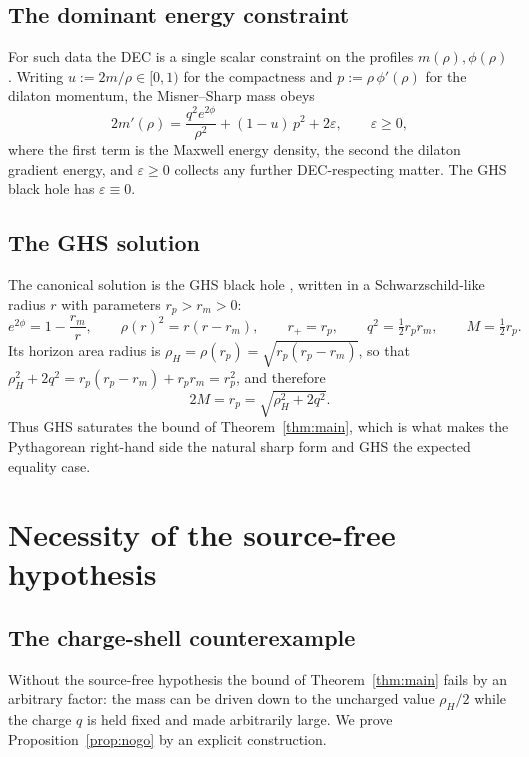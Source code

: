 \documentclass[11pt]{article}
\theoremstyle{plain}
\theoremstyle{definition}
\newcommand{\rH}{\rho_{\!H}}
\newcommand{\eps}{\varepsilon}
\begin{document}
\subsection{The dominant energy constraint}\label{sec:constraint}

For such data the DEC is a single scalar constraint on the profiles $m(\rho),\phi(\rho)$. Writing
$u:=2m/\rho\in[0,1)$ for the compactness and $p:=\rho\,\phi'(\rho)$ for the dilaton momentum, the Misner--Sharp
mass obeys
\begin{equation}\label{eq:constraint}
  2m'(\rho)=\frac{q^2e^{2\phi}}{\rho^2}+(1-u)\,p^2+2\eps,\qquad \eps\ge0,
\end{equation}
where the first term is the Maxwell energy density, the second the dilaton gradient energy, and $\eps\ge0$
collects any further DEC-respecting matter. The GHS black hole has $\eps\equiv0$.

\subsection{The GHS solution}\label{sec:ghs}

The canonical solution is the GHS black hole \cite{GHS,GibbonsMaeda}, written in a Schwarzschild-like radius
$r$ with parameters $r_p>r_m>0$:
\begin{equation}\label{eq:ghs}
  e^{2\phi}=1-\frac{r_m}{r},\qquad \rho(r)^2=r(r-r_m),\qquad
  r_+=r_p,\qquad q^2=\tfrac12 r_p r_m,\qquad M=\tfrac12 r_p .
\end{equation}
Its horizon area radius is $\rH=\rho(r_p)=\sqrt{r_p(r_p-r_m)}$, so that
$\rH^2+2q^2=r_p(r_p-r_m)+r_pr_m=r_p^2$, and therefore
\begin{equation*}
  2M=r_p=\sqrt{\rH^2+2q^2}.
\end{equation*}
Thus GHS saturates the bound of Theorem~\ref{thm:main}, which is what makes the Pythagorean right-hand side the
natural sharp form and GHS the expected equality case.

\section{Necessity of the source-free hypothesis}\label{sec:false}

\subsection{The charge-shell counterexample}\label{sec:shell}

Without the source-free hypothesis the bound of Theorem~\ref{thm:main} fails by an arbitrary factor: the mass
can be driven down to the uncharged value $\rH/2$ while the charge $q$ is held fixed and made arbitrarily
large. We prove Proposition~\ref{prop:nogo} by an explicit construction.
\end{document}
